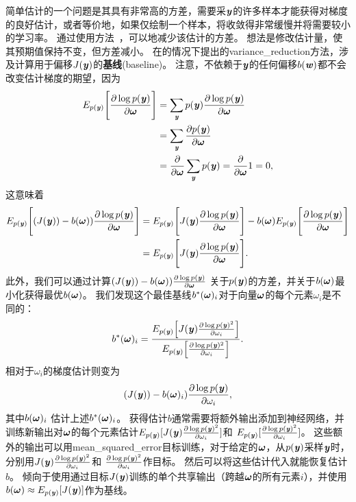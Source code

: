 简单估计的一个问题是其具有非常高的方差，需要采$\Vy$的许多样本才能获得对梯度的良好估计，或者等价地，如果仅绘制一个样本，将收敛得非常缓慢并将需要较小的学习率。
通过使用方法~\citep{Wilson-1984,LEcuyer-1994}，可以地减少该估计的方差。
想法是修改估计量，使其预期值保持不变，但方差减小。
在的情况下提出的\gls{variance_reduction}方法，涉及计算用于偏移$J(\Vy)$的\textbf{基线}(baseline)。
注意，不依赖于$\Vy$的任何偏移$b(\Vw)$都不会改变估计梯度的期望，因为
\begin{align}
 E_{p(\Vy)} \Bigg[ \frac{\partial\log p(\Vy)}{\partial \Vomega}  \Bigg] &=
 \sum_{\Vy} p(\Vy) \frac{\partial\log p(\Vy)}{\partial \Vomega} \\
 &= \sum_{\Vy} \frac{\partial p(\Vy)}{\partial \Vomega} \\
 &= \frac{\partial}{\partial \Vomega} \sum_{\Vy} p(\Vy) = 
 \frac{\partial}{\partial \Vomega} 1 = 0,
\end{align}
这意味着
\begin{align}
 E_{p(\Vy)} \Bigg[ (J(\Vy)) - b(\Vomega))\frac{\partial\log p(\Vy)}{\partial \Vomega}  \Bigg] &= 
 E_{p(\Vy)} \Bigg[ J(\Vy) \frac{\partial\log p(\Vy)}{\partial \Vomega} \Bigg]
 - b(\Vomega) E_{p(\Vy)} \Bigg[ \frac{\partial\log p(\Vy)}{\partial \Vomega}  \Bigg] \\
 &= E_{p(\Vy)} \Bigg[ J(\Vy) \frac{\partial\log p(\Vy)}{\partial \Vomega} \Bigg] .
\end{align}
此外，我们可以通过计算$(J(\Vy)) - b(\Vomega))\frac{\partial\log p(\Vy)}{\partial \Vomega} $
关于$p(\Vy)$的方差，并关于$b(\Vomega)$最小化获得最优$b(\Vomega)$。
我们发现这个最佳基线$b^*(\Vomega)_i$对于向量$\Vomega$的每个元素$\omega_i$是不同的：
\begin{align} \label{eq:est_b}
 b^*(\Vomega)_i = \frac{E_{p(\Vy)} \Big[ J(\Vy)
 \frac{\partial\log p(\Vy)^2}{\partial \omega_i}  \Big]}
{E_{p(\Vy)} \Big[\frac{\partial\log p(\Vy)^2}{\partial \omega_i}\Big] }.
\end{align}
相对于$\omega_i$的梯度估计则变为
\begin{align}
 (J(\Vy)) - b(\Vomega)_i)\frac{\partial\log p(\Vy)}{\partial \omega_i},
\end{align}
其中$ b(\Vomega)_i$ 估计上述$ b^*(\Vomega)_i$。
获得估计$b$通常需要将额外输出添加到神经网络，并训练新输出对$\Vomega$的每个元素估计$E_{p(\Vy)} 
[J(\Vy)\frac{\partial\log p(\Vy)^2}{\partial \omega_i}]$和
$E_{p(\Vy)}[\frac{\partial\log p(\Vy)^2}{\partial \omega_i}]$。
这些额外的输出可以用\gls{mean_squared_error}目标训练，对于给定的$\Vomega$，从$p(\Vy)$采样$\Vy$时，分别用$J(\Vy)\frac{\partial\log p(\Vy)^2}{\partial \omega_i}$和 $\frac{\partial\log p(\Vy)^2}{\partial \omega_i}$作目标。
然后可以将这些估计代入就能恢复估计$b$。
\citet{Mnih+Gregor-ICML2014} 倾向于使用通过目标$J(\Vy)$训练的单个共享输出（跨越$\Vomega$的所有元素$i$），并使用$b(\Vomega) \approx E_{p(\Vy)} [J(\Vy)]$作为基线。

